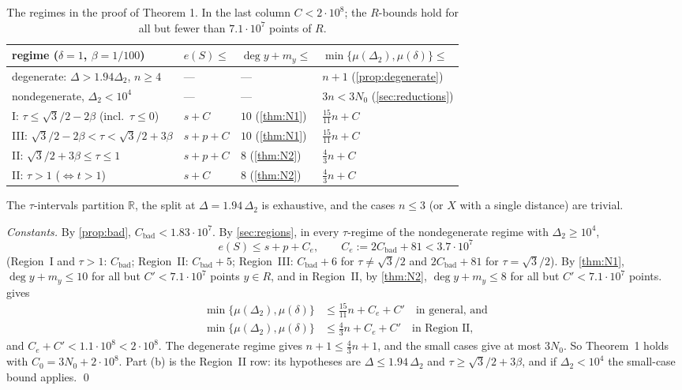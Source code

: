 \documentclass[11pt]{amsart}
\theoremstyle{definition}
\theoremstyle{remark}
\newcommand{\R}{\mathbb{R}}
\newcommand{\Dt}{\Delta_2}
\newcommand{\mult}{\mu}
\begin{document}
\begin{table}[ht]
\centering\small
\renewcommand{\arraystretch}{1.2}
\begin{tabular}{@{}llll@{}}
\toprule
regime ($\delta=1$, $\beta=1/100$) & $e(S)\le$ & $\deg y+m_y\le$ & $\min\{\mult(\Dt),\mult(\delta)\}\le$\\
\midrule
degenerate: $\Delta>1.94\Dt$, $n\ge4$ & --- & --- & $n+1$ (\cref{prop:degenerate})\\
nondegenerate, $\Dt<10^4$ & --- & --- & $3n<3N_0$ (\cref{sec:reductions})\\
I: $\tau\le\sqrt3/2-2\beta$ (incl.\ $\tau\le0$) & $s+C$ & $10$ (\cref{thm:N1}) & $\frac{15}{11}n+C$\\
III: $\sqrt3/2-2\beta<\tau<\sqrt3/2+3\beta$ & $s+p+C$ & $10$ (\cref{thm:N1}) & $\frac{15}{11}n+C$\\
II: $\sqrt3/2+3\beta\le\tau\le1$ & $s+p+C$ & $8$ (\cref{thm:N2}) & $\frac43n+C$\\
II: $\tau>1$ ($\Leftrightarrow t>1$) & $s+C$ & $8$ (\cref{thm:N2}) & $\frac43n+C$\\
\bottomrule
\end{tabular}
\caption{The regimes in the proof of Theorem 1. In the last column $C<2\cdot10^8$; the $R$-bounds hold for all but fewer than $7.1\cdot10^7$ points of $R$.}
\end{table}

The $\tau$-intervals partition $\R$, the split at $\Delta=1.94\,\Dt$ is exhaustive, and the cases $n\le3$ (or $X$ with a single distance) are trivial.

\emph{Constants.} By \cref{prop:bad}, $C_{\mathrm{bad}}<1.83\cdot10^7$. By \cref{sec:regions}, in every $\tau$-regime of the nondegenerate regime with $\Dt\ge10^4$,
\[
e(S)\le s+p+C_e,\qquad C_e:=2C_{\mathrm{bad}}+81<3.7\cdot10^7
\]
(Region~I and $\tau>1$: $C_{\mathrm{bad}}$; Region~II: $C_{\mathrm{bad}}+5$; Region~III: $C_{\mathrm{bad}}+6$ for $\tau\neq\sqrt3/2$ and $2C_{\mathrm{bad}}+81$ for $\tau=\sqrt3/2$). By \cref{thm:N1}, $\deg y+m_y\le10$ for all but $C'<7.1\cdot10^7$ points $y\in R$, and in Region~II, by \cref{thm:N2}, $\deg y+m_y\le 8$ for all but $C'<7.1\cdot10^7$ points.  gives
\begin{align*}
\min\{\mult(\Dt),\mult(\delta)\}&\le\tfrac{15}{11}n+C_e+C'\quad\text{in general, and}\\
\min\{\mult(\Dt),\mult(\delta)\}&\le\tfrac43n+C_e+C'\quad\text{in Region II,}
\end{align*}
and $C_e+C'<1.1\cdot10^8<2\cdot10^8$. The degenerate regime gives $n+1\le\frac43n+1$, and the small cases give at most $3N_0$. So Theorem~1 holds with $C_0=3N_0+2\cdot10^8$. Part (b) is the Region~II row: its hypotheses are $\Delta\le1.94\,\Dt$ and $\tau\ge\sqrt3/2+3\beta$, and if $\Dt<10^4$ the small-case bound applies. \qed
\end{document}
